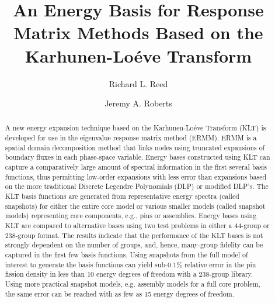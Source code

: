 \documentclass[5p,times,twocolumn,10pt]{elsarticle}
\begin{document}
    
    \begin{frontmatter}
        
        \title{An Energy Basis for Response Matrix Methods Based on the 
            Karhunen-Lo\'{e}ve Transform}
        
        
        \author{Richard L. Reed}
        \author{Jeremy A. Roberts}
        
        
        \address{Department of Mechanical and Nuclear Engineering, Kansas State 
            University}
        
        \begin{abstract}
            A new energy expansion technique based on the 
            Karhunen-Lo\'{e}ve Transform (KLT) is developed for use in the 
            eigenvalue response matrix method (ERMM).  ERMM is a spatial domain 
            decomposition method that links nodes using truncated expansions of 
            boundary fluxes in each phase-space variable.  Energy bases 
            constructed using KLT can capture a comparatively large amount of 
            spectral information in the first several basis functions, thus 
            permitting low-order expansions with less error than expansions 
            based on the more traditional Discrete Legendre Polynomials (DLP) 
            or modified DLP's. The KLT basis functions are generated from 
            representative energy spectra (called snapshots) for either the 
            entire core model or various smaller models (called snapshot 
            models) representing core 
            components, e.g., pins or assemblies. Energy bases using KLT are 
            compared to alternative bases using two test problems in either a 
            44-group or 238-group format.  The results indicate that the 
            performance of the KLT bases is not strongly dependent on the number 
            of groups, and, hence, many-group fidelity can be captured in the 
            first few basis functions. Using snapshots from the full model of 
            interest to generate the basis functions can 
            yield sub-$0.1\%$ relative error in the pin fission density in less 
            than 10 energy degrees of freedom with a 238-group library.  Using 
            more practical snapshot models, e.g. assembly models for a full 
            core problem, the same error can be reached with as few 
            as 15 energy degrees of freedom.
        \end{abstract}
        

\end{frontmatter}
\end{document}
